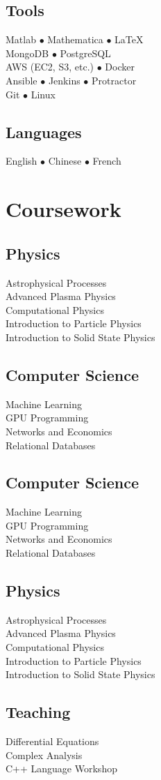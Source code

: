 \documentclass[]{yubo-resume-openfont}
\begin{document}
\begin{minipage}[t]{0.33\textwidth}
    \subsection{Tools}
    Matlab $\bullet$ Mathematica $\bullet$ \LaTeX\\
    MongoDB $\bullet$ PostgreSQL \\
    AWS (EC2, S3, etc.) $\bullet$ Docker\\
    Ansible $\bullet$ Jenkins $\bullet$ Protractor\\
    Git $\bullet$ Linux\\
    \sectionsep
    \subsection{Languages}
    English $\bullet$ Chinese $\bullet$ French
    \sectionsep




\def\PhWork{
    \subsection{Physics}
        Astrophysical Processes\\
        Advanced Plasma Physics\\
        Computational Physics\\
        Introduction to Particle Physics\\
        Introduction to Solid State Physics\\
}
\def\CSWork{
    \subsection{Computer Science}
        Machine Learning\\
        GPU Programming\\
        Networks and Economics\\
        Relational Databases
}

\section{Coursework}
    \ifisCS
        \PhWork
        \sectionsep
        \CSWork
    \else
        \CSWork
        \sectionsep
        \PhWork
    \fi
    \sectionsep

    \subsection{Teaching}
        Differential Equations\\
        Complex Analysis\\
        C++ Language Workshop
    \sectionsep

%
%

\end{minipage}
\end{document}
